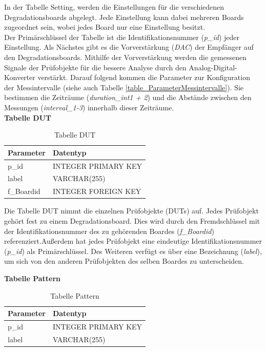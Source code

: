 In der Tabelle Setting, werden die Einstellungen  für die verschiedenen Degradationsboards abgelegt. Jede Einstellung kann dabei mehreren Boards zugeordnet sein, wobei jedes Board nur eine Einstellung besitzt.\\
Der Primärschlüssel der Tabelle ist die Identifikationsnummer (\textit{p\_id}) jeder Einstellung. Als Nächstes gibt es die Vorverstärkung (\textit{DAC}) der Empfänger auf den Degradationsboards. Mithilfe der Vorverstärkung werden die gemessenen Signale der Prüfobjekte für die bessere Analyse durch den Analog-Digital-Konverter verstärkt. Darauf folgend kommen die Parameter zur Konfiguration der Messintervalle (siehe auch Tabelle \ref{table_ParameterMessintervalle}). Sie bestimmen die Zeiträume (\textit{duration\_int1 + 2}) und die Abstände zwischen den Messungen (\textit{interval\_1-3}) innerhalb dieser Zeiträume.\\

\textbf{Tabelle DUT}\\

\begin{table}[H]
\begin{center}
\begin{tabular}{|l|l|}\hline
Parameter & Datentyp \\ \hline
p\_id & INTEGER PRIMARY KEY\\ 
label & VARCHAR(255)\\ 
f\_Boardid & INTEGER FOREIGN KEY\\ \hline
\end{tabular}
\caption{Tabelle DUT}
\label{table_TabelleDUT}
\end{center}
\end{table}

Die Tabelle DUT nimmt die einzelnen Prüfobjekte (\acp{DUT}) auf. Jedes Prüfobjekt gehört fest zu einem Degradationsboard. Dies wird durch den Fremdschlüssel mit der Identifikationsnummer des zu gehörenden Boardes (\textit{f\_Boardid}) referenziert.Außerdem hat jedes Prüfobjekt eine eindeutige Identifikationsnummer (\textit{p\_id}) als Primärschlüssel. Des Weiteren verfügt es über eine Bezeichnung (\textit{label}), um sich von den anderen Prüfobjekten des selben Boardes zu unterscheiden.



\textbf{Tabelle Pattern}\\

\begin{table}[H]
\begin{center}
\begin{tabular}{|l|l|}\hline
Parameter & Datentyp \\ \hline
p\_id & INTEGER PRIMARY KEY\\ 
label & VARCHAR(255)\\ \hline
\end{tabular}
\caption{Tabelle Pattern}
\label{table_TabellePattern}
\end{center}
\end{table}

